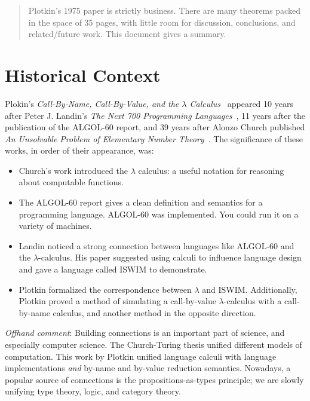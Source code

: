 \documentclass{article}
\begin{document}

\begin{abstract}
  Plotkin's 1975 paper is strictly business.
  There are many theorems packed in the space of 35 pages, with little room for discussion, conclusions, and related/future work.
  This document gives a summary.
\end{abstract}


\section{Historical Context}
Plokin's \emph{Call-By-Name, Call-By-Value, and the $\lambda$ Calculus}~\cite{p-call} appeared 10 years after Peter J. Landin's \emph{The Next 700 Programming Languages}~\cite{l-next},
 11 years after the publication of the ALGOL-60 report,
 and 39 years after Alonzo Church published \emph{An Unsolvable Problem of Elementary Number Theory}~\cite{c-unsolvable}.
The significance of these works, in order of their appearance, was:
\begin{itemize}
\item
  Church's work introduced the $\lambda$ calculus: a useful notation for reasoning about computable functions.
\item
  The ALGOL-60 report gives a clean definition and semantics for a programming language.
  ALGOL-60 was implemented.
  You could run it on a variety of machines.
\item
  Landin noticed a strong connection between languages like ALGOL-60 and the $\lambda$-calculus.
  His paper suggested using calculi to influence language design and gave a language called ISWIM to demonstrate.
\item
  Plotkin formalized the correspondence between $\lambda$ and ISWIM.
  Additionally, Plotkin proved a method of simulating a call-by-value $\lambda$-calculus with a call-by-name calculus, and another method in the opposite direction.
\end{itemize}


\emph{Offhand comment}: Building connections is an important part of science, and especially computer science.
The Church-Turing thesis unified different models of computation.
This work by Plotkin unified language calculi with language implementations \emph{and} by-name and by-value reduction semantics.
Nowadays, a popular source of connections is the propositions-as-types principle; we are slowly unifying type theory, logic, and category theory.
\end{document}
